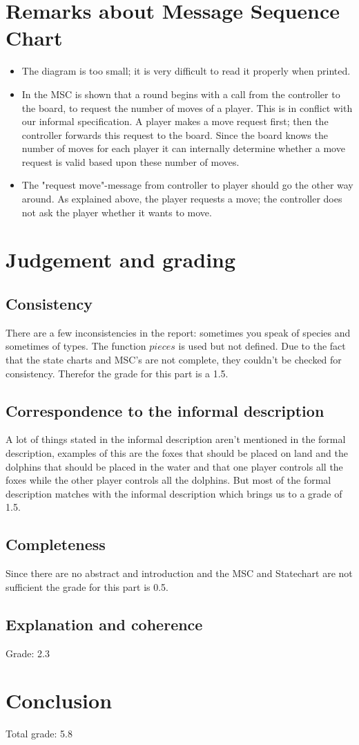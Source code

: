\documentclass[a4paper,11pt]{article}
\begin{document}
    \section{Remarks about Message Sequence Chart}
    \begin{itemize}
        \item The diagram is too small; it is very difficult to read it properly when printed.
        \item In the MSC is shown that a round begins with a call from the controller to the board, to request the number of moves of a player. This is in conflict with our informal specification. A player makes a move request first; then the controller forwards this request to the board. Since the board knows the number of moves for each player it can internally determine whether a move request is valid based upon these number of moves.
        \item The "request move"-message from controller to player should go the other way around. As explained above, the player requests a move; the controller does not ask the player whether it wants to move.
    \end{itemize}


    \section{Judgement and grading}
    \subsection{Consistency}
    There are a few inconsistencies in the report: sometimes you speak of species and sometimes of types. The function $pieces$ is used but not defined. Due to the fact that the state charts and MSC's are not complete, they couldn't be checked for consistency. Therefor the grade for this part is a 1.5.\\
    
    \subsection{Correspondence to the informal description}
    A lot of things stated in the informal description aren't mentioned in the formal description, examples of this are the foxes that should be placed on land and the dolphins that should be placed in the water and that one player controls all the foxes while the other player controls all the dolphins. But most of the formal description matches with the informal description which brings us to a grade of 1.5.\\

    \subsection{Completeness}
    Since there are no abstract and introduction and the MSC and Statechart are not sufficient the grade for this part is 0.5.\\

    \subsection{Explanation and coherence}    
    Grade: 2.3

    \section{Conclusion}
    Total grade: 5.8
\end{document}
